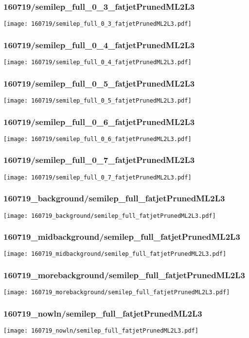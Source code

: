 \begin{frame}
   \frametitle{\small 160719/semilep\_full\_0\_3\_fatjetPrunedML2L3}
   \centering
   \texttt{[image: 160719/semilep\_full\_0\_3\_fatjetPrunedML2L3.pdf]}
\end{frame}

\begin{frame}
   \frametitle{\small 160719/semilep\_full\_0\_4\_fatjetPrunedML2L3}
   \centering
   \texttt{[image: 160719/semilep\_full\_0\_4\_fatjetPrunedML2L3.pdf]}
\end{frame}

\begin{frame}
   \frametitle{\small 160719/semilep\_full\_0\_5\_fatjetPrunedML2L3}
   \centering
   \texttt{[image: 160719/semilep\_full\_0\_5\_fatjetPrunedML2L3.pdf]}
\end{frame}

\begin{frame}
   \frametitle{\small 160719/semilep\_full\_0\_6\_fatjetPrunedML2L3}
   \centering
   \texttt{[image: 160719/semilep\_full\_0\_6\_fatjetPrunedML2L3.pdf]}
\end{frame}

\begin{frame}
   \frametitle{\small 160719/semilep\_full\_0\_7\_fatjetPrunedML2L3}
   \centering
   \texttt{[image: 160719/semilep\_full\_0\_7\_fatjetPrunedML2L3.pdf]}
\end{frame}

\begin{frame}
   \frametitle{\small 160719\_background/semilep\_full\_fatjetPrunedML2L3}
   \centering
   \texttt{[image: 160719\_background/semilep\_full\_fatjetPrunedML2L3.pdf]}
\end{frame}

\begin{frame}
   \frametitle{\small 160719\_midbackground/semilep\_full\_fatjetPrunedML2L3}
   \centering
   \texttt{[image: 160719\_midbackground/semilep\_full\_fatjetPrunedML2L3.pdf]}
\end{frame}

\begin{frame}
   \frametitle{\small 160719\_morebackground/semilep\_full\_fatjetPrunedML2L3}
   \centering
   \texttt{[image: 160719\_morebackground/semilep\_full\_fatjetPrunedML2L3.pdf]}
\end{frame}

\begin{frame}
   \frametitle{\small 160719\_nowln/semilep\_full\_fatjetPrunedML2L3}
   \centering
   \texttt{[image: 160719\_nowln/semilep\_full\_fatjetPrunedML2L3.pdf]}
\end{frame}

